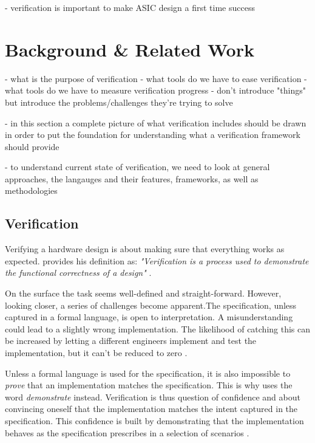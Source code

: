 \documentclass[12pt]{report}
\begin{document}
- verification is important to make ASIC design a first time success \cite[Ch. 3]{bergeron2012writing}

\chapter{Background \& Related Work} %

- what is the purpose of verification
- what tools do we have to ease verification
- what tools do we have to measure verification progress
- don't introduce "things" but introduce the problems/challenges they're trying to solve

- in this section a complete picture of what verification includes should be drawn in order to put the foundation for
understanding what a verification framework should provide

- to understand current state of verification, we need to look at general approaches, the langauges and their
features, frameworks, as well as methodologies

\section{Verification} %

Verifying a hardware design is about making sure that everything works as expected. \citeauthor{bergeron2012writing}
provides his definition as: \textit{"Verification is a process used to demonstrate the functional correctness of a
design"} \cite[Ch. 1]{bergeron2012writing}.

On the surface the task seems well-defined and straight-forward. However, looking closer, a series of challenges
become apparent.The specification, unless captured in a formal language, is open to interpretation. A
misunderstanding could lead to a slightly wrong implementation. The likelihood of catching this can be increased by
letting a different engineers implement and test the implementation, but it can't be reduced to zero \cite[Ch.
1]{bergeron2012writing}.

Unless a formal language is used for the specification, it is also impossible to \textit{prove} that an
implementation matches the specification. This is why \citeauthor{bergeron2012writing} uses the word
\textit{demonstrate} instead. Verification is thus question of confidence and about convincing oneself that the
implementation matches the intent captured in the specification. This confidence is built by demonstrating that the
implementation behaves as the specification prescribes in a selection of scenarios \cite[Ch. 1]{bergeron2012writing}.
\end{document}
